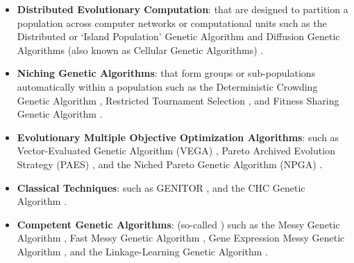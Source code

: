 \begin{bibunit}
\begin{itemize}
	\item \textbf{Distributed Evolutionary Computation}: that are designed to partition a population across computer networks or computational units such as the Distributed or `Island Population' Genetic Algorithm \cite{Tanese1989, Cantu-Paz2000} and Diffusion Genetic Algorithms (also known as Cellular Genetic Algorithms) \cite{Alba2008}.
	\item \textbf{Niching Genetic Algorithms}: that form groups or sub-populations automatically within a population such as the Deterministic Crowding Genetic Algorithm \cite{Mahfoud1992, Mahfoud1995}, Restricted Tournament Selection \cite{Harik1994, Harik1995}, and Fitness Sharing Genetic Algorithm \cite{Goldberg1987, Deb1989}.
	\item \textbf{Evolutionary Multiple Objective Optimization Algorithms}: such as Vector-Evaluated Genetic Algorithm (VEGA) \cite{Schaffer1984}, Pareto Archived Evolution Strategy (PAES) \cite{Knowles1999, Knowles1999a}, and the Niched Pareto Genetic Algorithm (NPGA) \cite{Horn1994}.
	\item \textbf{Classical Techniques}: such as GENITOR \cite{Whitley1989}, and the CHC Genetic Algorithm \cite{Eshelman1991}.
	\item \textbf{Competent Genetic Algorithms}: (so-called \cite{Goldberg2002}) such as the Messy Genetic Algorithm \cite{Goldberg1989a, Goldberg1990}, Fast Messy Genetic Algorithm \cite{Goldberg1993}, Gene Expression Messy Genetic Algorithm \cite{Kargupta1996}, and the Linkage-Learning Genetic Algorithm \cite{Harik1996}.
\end{itemize}


\putbib
\end{bibunit}

